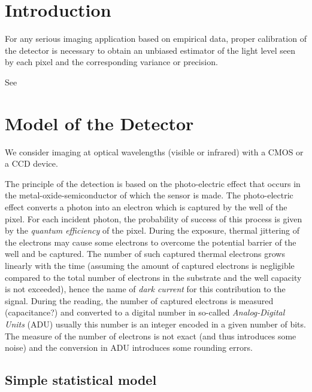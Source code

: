 \documentclass[a4paper,11pt,twoside]{scrartcl}
\title{\Title}
\author{\Authors}
\date{started on April 18, 2018; current: \today}
\newcommand{\oops}[1]{\textcolor[named]{BrickRed}{#1}}
\theoremstyle{plain} %
\theoremstyle{definition}
\theoremstyle{remark}
\begin{document}
\maketitle

\section{Introduction}

For any serious imaging application based on empirical data, proper
calibration of the detector is necessary to obtain an unbiased estimator of
the light level seen by each pixel and the corresponding variance or precision.

\oops{See \citet{Foi_et_al-2008-Poissonian_Gaussian_noise_model_fitting}}


\section{Model of the Detector}
\label{sec:detector-model}

We consider imaging at optical wavelengths (visible or infrared) with a
CMOS or a CCD device.

The principle of the detection is based on the photo-electric effect that
occurs in the metal-oxide-semiconductor of which the sensor is made.
The photo-electric effect converts a photon into an electron which is
captured by the well of the pixel.  For each incident photon, the
probability of success of this process is given by the \emph{quantum
efficiency} of the pixel.  During the exposure, thermal jittering of the
electrons may cause some electrons to overcome the potential barrier of the
well and be captured.  The number of such captured thermal electrons grows
linearly with the time (assuming the amount of captured electrons is
negligible compared to the total number of electrons in the substrate and
the well capacity is not exceeded), hence the name of \emph{dark current}
for this contribution to the signal.  During the reading, the number of
captured electrons is measured (capacitance?) and converted to a digital
number in so-called \emph{Analog-Digital Units} (ADU) usually this number
is an integer encoded in a given number of bits.  The measure of the number
of electrons is not exact (and thus introduces some noise) and the
conversion in ADU introduces some rounding errors.


\subsection{Simple statistical model}
\label{sec:statistical-model}
\end{document}
